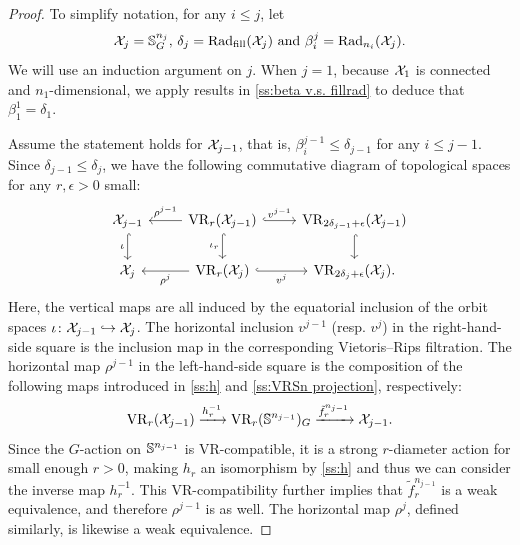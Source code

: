 \begin{proof}
	To simplify notation, for any $i \leq j$, let
	\[
	\mathcal{X}_j = \mathbb{S}^{n_j}_G, \,\delta_j = \mathrm{Rad}_{\mathrm{fill}}(\mathcal{X}_j) \text{ and }\beta_i^j = \mathrm{Rad}_{n_i}(\mathcal{X}_j).
	\]
	We will use an induction argument on $j$.
	When $j = 1$, because $\mathcal{X}_1$ is connected and $n_1$-dimensional, we apply results in \cref{ss:beta v.s. fillrad} to deduce that $\beta_1^1 = \delta_1$.

	Assume the statement holds for $\mathcal{X}_{j-1}$, that is, $\beta_i^{j-1} \leq \delta_{j-1}$ for any $i \leq j-1$.
	Since $\delta_{j-1} \leq \delta_j$, we have the following commutative diagram of topological spaces for any $r,\epsilon>0$ small:
	\begin{equation}\label{eq:fundamental_bars_diagram}
		\begin{tikzcd}
			\cX_{j-1}
			\ar[d, hook,"{\iota}" left]
			&
			\VR_r(\cX_{j-1})
			\ar[d, hook,"\iota_r" left]
			\ar[l, "\rho^{j-1}" above]
			\ar[r, hook, "v^{j-1}"]
			&
			\VR_{2\delta_{j-1}+\epsilon}(\cX_{j-1})
			\ar[d, hook]
			\\
			\cX_j
			&
			\VR_r(\cX_j)
			\ar[l, "\rho^j" below]
			\ar[r, hook, "v^j" below]
			&
			\VR_{2\delta_j+\epsilon}(\cX_j).
		\end{tikzcd}
	\end{equation}
	Here, the vertical maps are all induced by the equatorial inclusion of the orbit spaces $\iota \colon \mathcal{X}_{j-1} \hookrightarrow \mathcal{X}_j$.
	The horizontal inclusion $v^{j-1}$ (resp. $v^j$) in the right-hand-side square is the inclusion map in the corresponding Vietoris--Rips filtration.
	The horizontal map $\rho^{j-1}$ in the left-hand-side square is the composition of the following maps introduced in \cref{ss:h} and \cref{ss:VRSn projection}, respectively:
	\[\mathrm{VR}_r(\mathcal{X}_{j-1}) \xrightarrow{h^{-1}_r}\mathrm{VR}_r(\mathbb{S}^{n_{j-1}})_G \xrightarrow{\tilde{f}_r^{n_{j-1}}} \mathcal{X}_{j-1}.\]
	Since the \(G\)-action on \(\mathbb{S}^{n_{j-1}}\) is VR-compatible, it is a strong \(r\)-diameter action for small enough $r>0$, making \(h_r\) an isomorphism by \cref{ss:h} and thus we can consider the inverse map $h^{-1}_r$.
	This VR-compatibility further implies that \(\tilde{f}_r^{n_{j-1}}\) is a weak equivalence, and therefore \(\rho^{j-1}\) is as well.
	The horizontal map \(\rho^j\), defined similarly, is likewise a weak equivalence.


\end{proof}
